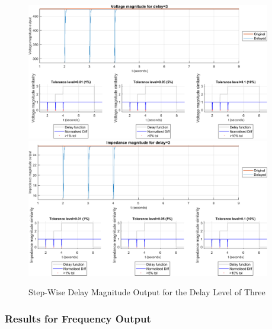 \begin{figure}
    \caption{Step-Wise Delay Magnitude Output for the Delay Level of Three}
    \includegraphics[width=0.95\textwidth]{PMUsim-figures/DelayOf_3/Step_vMagnitude.png}    
      \includegraphics[width=0.95\textwidth]{PMUsim-figures/DelayOf_3/Step_iMagnitude.png}      
    \label{fig:PMUsimStep_Three_Magnitude}
    \begin{small}
     \end{small}
\end{figure}

\newpage \subsubsection{Results for Frequency Output}


